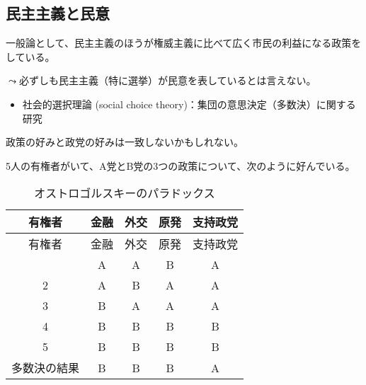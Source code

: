 \documentclass[
  xelatex,
  ja=standard]{bxjsarticle}
\providecommand{\tightlist}{%
  \setlength{\itemsep}{0pt}\setlength{\parskip}{0pt}}\usepackage{longtable,booktabs,array}
\begin{document}
\hypertarget{ux6c11ux4e3bux4e3bux7fa9ux3068ux6c11ux610f}{%
\subsection{民主主義と民意}\label{ux6c11ux4e3bux4e3bux7fa9ux3068ux6c11ux610f}}

一般論として、民主主義のほうが権威主義に比べて広く市民の利益になる政策をしている。

\(\leadsto\)必ずしも民主主義（特に選挙）が民意を表しているとは言えない。

\begin{itemize}
\tightlist
\item
  社会的選択理論 (social choice
  theory)：集団の意思決定（多数決）に関する研究\citep{sakai2015, sakai2016}
\end{itemize}

政策の好みと政党の好みは一致しないかもしれない。

\begin{tcolorbox}[enhanced jigsaw, colback=white, left=2mm, toptitle=1mm, title=\textcolor{quarto-callout-note-color}{\faInfo}\hspace{0.5em}{政策の好みと政党の好み}, toprule=.15mm, arc=.35mm, colbacktitle=quarto-callout-note-color!10!white, titlerule=0mm, opacityback=0, opacitybacktitle=0.6, bottomrule=.15mm, bottomtitle=1mm, rightrule=.15mm, coltitle=black, leftrule=.75mm, breakable, colframe=quarto-callout-note-color-frame]

5人の有権者がいて、A党とB党の3つの政策について、次のように好んでいる。

\end{tcolorbox}

\begin{longtable}[]{@{}ccccc@{}}
\caption{オストロゴルスキーのパラドックス\citep[p.23]{sakai2016}}\tabularnewline
\toprule\noalign{}
有権者 & 金融 & 外交 & 原発 & 支持政党 \\
\midrule\noalign{}
\endfirsthead
\toprule\noalign{}
有権者 & 金融 & 外交 & 原発 & 支持政党 \\
\midrule\noalign{}
\endhead
\bottomrule\noalign{}
\endlastfoot
1 & A & A & B & A \\
2 & A & B & A & A \\
3 & B & A & A & A \\
4 & B & B & B & B \\
5 & B & B & B & B \\
多数決の結果 & B & B & B & A \\
\end{longtable}
\end{document}

